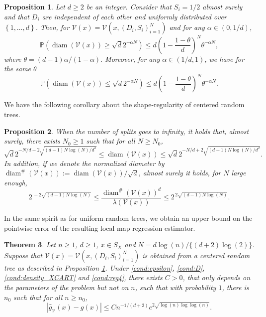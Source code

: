 \documentclass[paper=a4, fontsize=11pt]{scrartcl}
\newcommand{\diam}{\operatorname{diam}}
\newcommand{\PP}{\mathbb{P}}
\newtheorem{theorem}{Theorem}
\newtheorem{proposition}[theorem]{Proposition}
\begin{document}
\begin{proposition}\label{prop:diam_CRT}
Let $d\geq 2$ be an integer. Consider that $S_i=1/2 $ almost surely and that $D_i$ are independent of each other and uniformly distributed over $\left\{ 1,\ldots,d\right\}$. Then, for $\mathcal V (x)= \mathcal V(x, (D_i,S_i)_{i=1}^N)$ and for any $\alpha \in (0,1/d)$,
\begin{equation*}
    \PP(\diam(\mathcal{V}(x))\geq \sqrt{d}2^{-\alpha N}) \leq d\left(1-\frac{1-\theta}{d}\right)^N \theta^{-\alpha N},
\end{equation*}
where $\theta=(d-1)\alpha/(1-\alpha).$ Moreover, for any $\alpha \in (1/d,1)$, we have for the same $\theta$
\begin{equation*}
    \PP(\diam(\mathcal{V}(x))\leq \sqrt{d}2^{-\alpha N}) \leq d\left(1-\frac{1-\theta}{d}\right)^N \theta^{-\alpha N}.
\end{equation*}
\end{proposition}

We have the following corollary about the shape-regularity of centered random trees.

\begin{proposition}\label{cor22}
When the number of splits goes to infinity, it holds that, almost surely, there exists $N_0\geq 1$ such that for all $N\geq N_0$,
$$ \sqrt{d} 2^{-N/d-2\sqrt{(d-1)N\log(N)/d^2}} \leq \diam(\mathcal{V}(x)) \leq \sqrt d 2^{-N/d+2\sqrt{(d-1)N\log(N)/d^2}}.$$
In addition, if we denote the normalized diameter by $\diam^{\#}(\mathcal{V}(x)) := \diam(\mathcal{V}(x))/\sqrt{d}$, almost surely it holds, for $N$ large enough,
\begin{equation*}
  2^{\, -2\sqrt{(d-1)N\log(N)}}   \leq \dfrac{\diam^{\#}(\mathcal{V}(x))^d}{\lambda(\mathcal{V}(x))} \leq 2^{ \, 2\sqrt{(d-1)N\log(N)}}. 
\end{equation*}
\end{proposition}


In the same spirit as for uniform random trees, we obtain an upper bound on the pointwise error of the resulting local map regression estimator. 

\begin{theorem}\label{cor_UcR}
Let  $n\geq 1$, $d\geq 1$, $x\in S_X$ and $N=d\log(n)/\{(d+2)\log(2)\}$. Suppose that $\mathcal V (x)= \mathcal V(x, (D_i,S_i)_{i=1}^N)$ is obtained from a centered random tree as described in Proposition \ref{prop:diam_CRT}. Under \ref{cond:epsilon}, \ref{cond:D}, \ref{cond:density_XCART} and \ref{cond:reg4}, there exists $C>0$, that only depends on the parameters of the problem but not on $n$, such that with probability $1$, there is $n_0$ such that for all $ n \geq n_0$,
\[
 | \hat g_{\mathcal V}(x) - g(x)| \leq
 C n^{-1/(d+2)}e^{2\sqrt{\log(n)\log\log (n)}}.
\]
\end{theorem}
\end{document}
